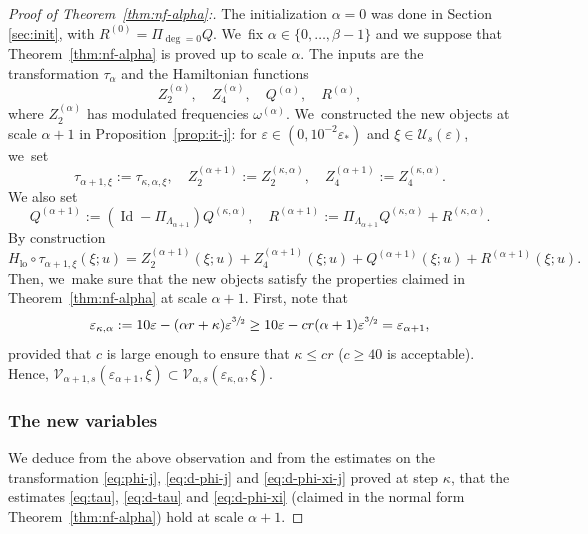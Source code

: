 \documentclass[JEP,XML,SOM,Unicode,published]{cedram}
\theoremstyle{plain}
\theoremstyle{definition}
\DeclareMathOperator{\lo}{lo}
\newcommand{\1}{\mathbf{1}}
\let\epsilon\varepsilon
\begin{document}
\begin{proof}[Proof of Theorem~\ref{thm:nf-alpha}:] The initialization $\alpha=0$ was done in Section \ref{sec:init}, with $R^{(0)}=\Pi_{\deg=0}Q$. We~fix $\alpha\in\{0,\dots,\beta-1\}$ and we suppose that Theorem~\ref{thm:nf-alpha} is proved up to scale $\alpha$. The inputs are the transformation $\tau_{\alpha}$ and the Hamiltonian functions
\[
Z_{2}^{(\alpha)},\quad Z_{4}^{(\alpha)},\quad Q^{(\alpha)},\quad R^{(\alpha)},
\]
where $Z_{2}^{(\alpha)}$ has modulated frequencies $\omega^{(\alpha)}$. We~constructed the new objects at scale $\alpha+1$ in Proposition~\ref{prop:it-j}: for $\epsilon\in(0,10^{-2}\epsilon_{\ast})$ and $\xi\in\mathcal{U}_{s}(\epsilon)$, we~set
\[
\tau_{\alpha+1,\xi}:= \tau_{\kappa,\alpha,\xi},\quad Z_{2}^{(\alpha+1)} := Z_{2}^{(\kappa,\alpha)},\quad Z_{4}^{(\alpha+1)} := Z_{4}^{(\kappa,\alpha)}.
\]
We also set
\[
Q^{(\alpha+1)} :=(\operatorname{Id}- \Pi_{\Lambda_{\alpha+1}})Q^{(\kappa,\alpha)},
\quad
R^{(\alpha+1)} := \Pi_{\Lambda_{\alpha+1}}Q^{(\kappa,\alpha)}
+ R^{(\kappa,\alpha)}.
\]
By construction
\[
H_{\lo}\circ\tau_{\alpha+1,\xi}(\xi;u) =
Z_{2}^{(\alpha+1)}(\xi;u)
+ Z_{4}^{(\alpha+1)}(\xi;u)
+ Q^{(\alpha+1)}(\xi;u)
+R^{(\alpha+1)}(\xi;u).
\]
Then, we~make sure that the new objects satisfy the properties claimed in Theorem~\ref{thm:nf-alpha} at scale $\alpha+1$. First, note that
\[
\epsilon_{\kappa,\alpha} := 10\epsilon - (\alpha r + \kappa)\epsilon^{\sfrac{3}{2}}
\geq
10\epsilon - cr(\alpha+1)\epsilon^{\sfrac{3}{2}}
=\epsilon_{\alpha+1},
\]
provided that $c$ is large enough to ensure that $\kappa\leq cr$ ($c\geq40$ is acceptable). Hence, $\mathcal{V}_{\alpha+1,s}(\epsilon_{\alpha+1},\xi) \subset \mathcal{V}_{\alpha,s}(\epsilon_{\kappa,\alpha},\xi)$.

\subsubsection*{The new variables} We deduce from the above observation and from the estimates on the transformation \eqref{eq:phi-j}, \eqref{eq:d-phi-j} and \eqref{eq:d-phi-xi-j} proved at step $\kappa$, that the estimates \eqref{eq:tau}, \eqref{eq:d-tau} and \eqref{eq:d-phi-xi} (claimed in the normal form Theorem~\ref{thm:nf-alpha}) hold at scale $\alpha+1$.


\end{proof}
\end{document}
